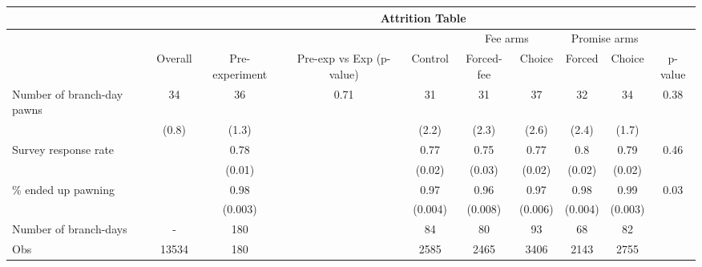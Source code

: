 \begin{tabular}{lccccccccc}
\toprule
      & \multicolumn{9}{c}{Attrition Table} \\
\midrule
      &       &       &       &       & \multicolumn{2}{c}{Fee arms} & \multicolumn{2}{c}{Promise arms} &  \\
\midrule
\midrule
      & \multicolumn{1}{p{4.045em}}{Overall} & \multicolumn{1}{p{5.59em}}{Pre-experiment} & \multicolumn{1}{p{6.455em}}{Pre-exp vs Exp (p-value)} & \multicolumn{1}{p{4.045em}}{Control} & \multicolumn{1}{p{5em}}{Forced-fee} & \multicolumn{1}{p{4.045em}}{Choice} & \multicolumn{1}{p{4.045em}}{Forced} & \multicolumn{1}{p{4.045em}}{Choice } & \multicolumn{1}{p{4.045em}}{p-value} \\
\midrule
\midrule
Number of branch-day pawns & 34    & 36    & 0.71  & 31    & 31    & 37    & 32    & 34    & 0.38 \\
      & (0.8) & (1.3) &       & (2.2) & (2.3) & (2.6) & (2.4) & (1.7) &  \\
Survey response rate &       & 0.78  &       & 0.77  & 0.75  & 0.77  & 0.8   & 0.79  & 0.46 \\
      &       & (0.01) &       & (0.02) & (0.03) & (0.02) & (0.02) & (0.02) &  \\
\% ended up pawning &       & 0.98  &       & 0.97  & 0.96  & 0.97  & 0.98  & 0.99  & 0.03 \\
      &       & (0.003) &       & (0.004) & (0.008) & (0.006) & (0.004) & (0.003) &  \\
Number of branch-days & -     & 180   &       & 84    & 80    & 93    & 68    & 82    &  \\
\midrule
Obs   & 13534 & 180   &       & 2585  & 2465  & 3406  & 2143  & 2755  &  \\
\bottomrule
\bottomrule
\end{tabular}%
